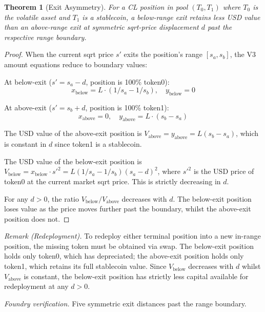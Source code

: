 \documentclass[11pt,a4paper]{article}
\newtheorem{theorem}{Theorem}
\theoremstyle{definition}
\begin{document}
\begin{theorem}[Exit Asymmetry]
For a CL position in pool $(T_0, T_1)$ where $T_0$ is the volatile asset and $T_1$ is a stablecoin, a below-range exit retains less USD value than an above-range exit at symmetric sqrt-price displacement $d$ past the respective range boundary.
\end{theorem}

\begin{proof}
When the current sqrt price $s'$ exits the position's range $[s_a, s_b]$, the V3 amount equations reduce to boundary values:

At below-exit ($s' = s_a - d$, position is 100\% token0):
\begin{equation}
x_{\text{below}} = L \cdot (1/s_a - 1/s_b), \quad y_{\text{below}} = 0
\end{equation}

At above-exit ($s' = s_b + d$, position is 100\% token1):
\begin{equation}
x_{\text{above}} = 0, \quad y_{\text{above}} = L \cdot (s_b - s_a)
\end{equation}

The USD value of the above-exit position is $V_{\text{above}} = y_{\text{above}} = L(s_b - s_a)$, which is constant in $d$ since token1 is a stablecoin.

The USD value of the below-exit position is $V_{\text{below}} = x_{\text{below}} \cdot s'^2 = L(1/s_a - 1/s_b)(s_a - d)^2$, where $s'^2$ is the USD price of token0 at the current market sqrt price. This is strictly decreasing in $d$.

For any $d > 0$, the ratio $V_{\text{below}}/V_{\text{above}}$ decreases with $d$. The below-exit position loses value as the price moves further past the boundary, whilst the above-exit position does not.
\end{proof}

\noindent\textit{Remark (Redeployment).} To redeploy either terminal position into a new in-range position, the missing token must be obtained via swap. The below-exit position holds only token0, which has depreciated; the above-exit position holds only token1, which retains its full stablecoin value. Since $V_{\text{below}}$ decreases with $d$ whilst $V_{\text{above}}$ is constant, the below-exit position has strictly less capital available for redeployment at any $d > 0$.

\noindent\textit{Foundry verification.} Five symmetric exit distances past the range boundary.
\end{document}
